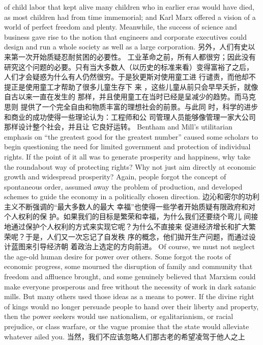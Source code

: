 \begin{paracol}{2}
of child labor that kept alive many children who in earlier eras
would have died, as most children had from time immemorial;
and Karl Marx offered a vision of a world of perfect freedom
and plenty. Meanwhile, the success of science and business
gave rise to the notion that engineers and corporate executives
could design and run a whole society as well as a large corporation.
\switchcolumn
另外，人们有史以来第一次开始质疑忍耐贫困的必要性。
工业革命之前，所有人都很穷；因此没有研究这个问题的必要。只有当大多数人（以历史的标准来看）变得富裕了之后，
人们才会疑惑为什么有人仍然很穷。于是狄更斯对使用童工进
行谴责，而他却不提正是使用童工才帮助了很多儿童生存下
来 ，这些儿童从前只会早早夭折，就像自古以来一直在发生的
那样，并且使用童工在当时已经是呈减少的趋势。而马克思则
提供了一个完全自由和物质丰富的理想社会的前景。与此同
时，科学的进步和商业的成功使得一些理论认为：工程师和公
司管理人员能够像管理一家大公司那样设计整个社会，并且让
它良好运转。
\switchcolumn*
Bentham and Mill's utilitarian emphasis on ``the greatest good for the greatest number'' caused some scholars to begin
questioning the need for limited government and protection of
individual rights. If the point of it all was to generate prosperity
and happiness, why take the roundabout way of protecting
rights? Why not just aim directly at economic growth and
widespread prosperity? Again, people forgot the concept of
spontaneous order, assumed away the problem of production,
and developed schemes to guide the economy in a politically
chosen direction.
\switchcolumn
边沁和密尔的功利主义不断强调的“最大多数人的最大
幸福”也使得一些学者开始质疑有限政府和对个人权利的保
护。如果我们的目标是繁荣和幸福，为什么我们还要绕个弯儿
间接地通过保护个人权利的方式来实现它呢？为什么不直接来
促进经济增长和扩大繁荣呢？于是，人们又一次忘记了自发秩
序的概念，他们拋开生产问题，而通过设计蓝图来引导经济朝
着政治上选定的方向前进。
\switchcolumn*
Of course, we must not neglect the age-old human desire
for power over others. Some forgot the roots of economic
progress, some mourned the disruption of family and community that freedom and affluence brought, and some genuinely
believed that Marxism could make everyone prosperous and
free without the necessity of work in dark satanic mills. But
many others used those ideas as a means to power. If the divine right of kings would no longer persuade people to hand
over their liberty and property, then the power seekers would
use nationalism, or egalitarianism, or racial prejudice, or class
warfare, or the vague promise that the state would alleviate
whatever ailed you.
\switchcolumn
当然，我们不应该忽略人们那古老的希望凌驾于他人之上

\end{paracol}
